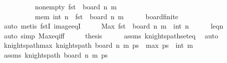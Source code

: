 \begin{isabellebody}
\ \ \ \ \ \ \ \ \ \ non{\isacharunderscore}{\kern0pt}empty{\isacharcolon}{\kern0pt}\ {\isachardoublequoteopen}{\isacharparenleft}{\kern0pt}fst{\isacharparenright}{\kern0pt}\ {\isacharbackquote}{\kern0pt}\ board\ n\ m\ {\isasymnoteq}\ {\isacharbraceleft}{\kern0pt}{\isacharbraceright}{\kern0pt}{\isachardoublequoteclose}\ \isanewline
\ \ \ \ \ \ \ \ \ \ mem{\isacharunderscore}{\kern0pt}{}{\isacharcolon}{\kern0pt}\ {\isachardoublequoteopen}int\ n\ {\isasymin}\ {\isacharparenleft}{\kern0pt}fst{\isacharparenright}{\kern0pt}\ {\isacharbackquote}{\kern0pt}\ board\ n\ m{\isachardoublequoteclose}\isanewline
\ \ \ \ \isamarkupfalse%
\ board{\isacharunderscore}{\kern0pt}finite\ \isamarkupfalse%
\ auto\ {\isacharparenleft}{\kern0pt}metis\ fstI\ image{\isacharunderscore}{\kern0pt}eqI{\isacharparenright}{\kern0pt}\isanewline
\ \ \isamarkupfalse%
\ \isamarkupfalse%
\ {\isachardoublequoteopen}Max\ {\isacharparenleft}{\kern0pt}{\isacharparenleft}{\kern0pt}fst{\isacharparenright}{\kern0pt}\ {\isacharbackquote}{\kern0pt}\ board\ n\ m{\isacharparenright}{\kern0pt}\ {\isacharequal}{\kern0pt}\ int\ n{\isachardoublequoteclose}\isanewline
\ \ \ \ \isamarkupfalse%
\ leq{\isacharunderscore}{\kern0pt}n\ \isamarkupfalse%
\ {\isacharparenleft}{\kern0pt}auto\ simp{\isacharcolon}{\kern0pt}\ Max{\isacharunderscore}{\kern0pt}eq{\isacharunderscore}{\kern0pt}iff{\isacharparenright}{\kern0pt}\isanewline
\ \ \isamarkupfalse%
\ \isamarkupfalse%
\ {\isacharquery}{\kern0pt}thesis\isanewline
\ \ \ \ \isamarkupfalse%
\ assms\ knights{\isacharunderscore}{\kern0pt}path{\isacharunderscore}{\kern0pt}set{\isacharunderscore}{\kern0pt}eq\ \isamarkupfalse%
\ auto\isanewline
{}\isamarkupfalse%
%
\endisatagproof
{\isafoldproof}%
%
\isadelimproof
\isanewline
%
\endisadelimproof
\isanewline
{}\isamarkupfalse%
\ knights{\isacharunderscore}{\kern0pt}path{\isacharunderscore}{\kern0pt}max{}{\isacharcolon}{\kern0pt}\ {\isachardoublequoteopen}knights{\isacharunderscore}{\kern0pt}path\ {\isacharparenleft}{\kern0pt}board\ n\ m{\isacharparenright}{\kern0pt}\ ps\ {\isasymLongrightarrow}\ max{}\ ps\ {\isacharequal}{\kern0pt}\ int\ m{\isachardoublequoteclose}\isanewline
%
\isadelimproof
%
\endisadelimproof
%
\isatagproof
{}\isamarkupfalse%
\ {\isacharminus}{\kern0pt}\isanewline
\ \ \isamarkupfalse%
\ assms{\isacharcolon}{\kern0pt}\ {\isachardoublequoteopen}knights{\isacharunderscore}{\kern0pt}path\ {\isacharparenleft}{\kern0pt}board\ n\ m{\isacharparenright}{\kern0pt}\ ps{\isachardoublequoteclose}\isanewline

\end{isabellebody}
